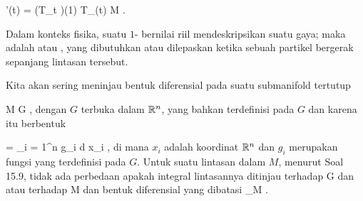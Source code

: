 \mavergleichskette
{\vergleichskette
{  \gamma'(t)
}
{ = }{ (T_t \gamma)(1)
}
{ \in }{ T_{\gamma (t)} M
}
{    }{
}
{   }{
}
}
{}{}{.}

{}
{

Dalam konteks fisika, suatu
$1$-
bernilai riil
 {} {}
mendeskripsikan suatu gaya; maka
adalah  {} atau  {,} yang dibutuhkan atau dilepaskan ketika sebuah partikel bergerak sepanjang lintasan tersebut.

}

Kita akan sering meninjau bentuk diferensial pada suatu submanifold tertutup

\mavergleichskette
{\vergleichskette
{M
}
{ \subseteq }{G
}
{  }{
}
{    }{
}
{   }{
}
}
{}{}{,}
dengan $G$ terbuka dalam ${\mathbb R}^n$, yang bahkan terdefinisi pada $G$ dan karena itu berbentuk

\mavergleichskette
{\vergleichskette
{ \omega
}
{ = }{ \sum_{i = 1}^n g_i d x_i
}
{  }{
}
{    }{
}
{   }{
}
}
{}{}{,}
di mana $x_i$ adalah koordinat ${\mathbb R}^n$ dan $g_i$ merupakan fungsi yang terdefinisi pada $G$. Untuk suatu lintasan dalam $M$, menurut
Soal 15.9,
tidak ada perbedaan apakah integral lintasannya ditinjau terhadap
\mathkor {} {G} {dan} {\omega} {}
atau terhadap
\mathkor {} {M} {dan bentuk diferensial yang dibatasi} {\omega \vert_M} {.}

